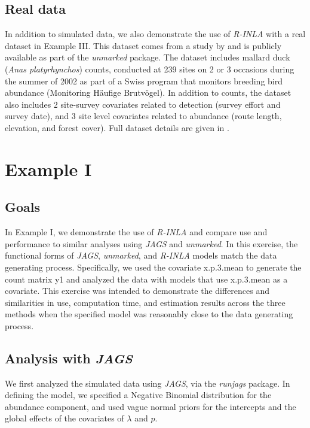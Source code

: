 \documentclass{article}
\begin{document}
\subsection[Real data]{Real data}
In addition to simulated data, we also demonstrate the use of \emph{R-INLA} with a real dataset in Example III. This dataset comes from a study by \cite{Kery_Royle_Schmid_2005} and is publicly available as part of the \emph{unmarked} package. The dataset includes mallard duck (\emph{Anas platyrhynchos}) counts, conducted at 239 sites on 2 or 3 occasions during the summer of 2002 as part of a Swiss program that monitors breeding bird abundance (Monitoring H\"{a}ufige Brutv\"{o}gel). In addition to counts, the dataset also includes 2 site-survey covariates related to detection (survey effort and survey date), and 3 site level covariates related to abundance (route length, elevation, and forest cover). Full dataset details are given in \cite{Kery_Royle_Schmid_2005}.

\section[Example I]{Example I}
\subsection[Goals]{Goals}
In Example I, we demonstrate the use of \emph{R-INLA} and compare use and performance to similar analyses using \emph{JAGS} and \emph{unmarked}. In this exercise, the functional forms of \emph{JAGS}, \emph{unmarked}, and \emph{R-INLA} models match the data generating process.  Specifically, we used the covariate x.p.3.mean to generate the count matrix y1 and analyzed the data with models that use x.p.3.mean as a covariate. This exercise was intended to demonstrate the differences and similarities in use, computation time, and estimation results across the three methods when the specified model was reasonably close to the data generating process.

\subsection[Analysis with JAGS]{Analysis with \emph{JAGS}}
We first analyzed the simulated data using \emph{JAGS}, via the \emph{runjags} package. In defining the model, we specified a Negative Binomial distribution for the abundance component, and used vague normal priors for the intercepts and the global effects of the covariates of $\lambda$ and $p$.
\end{document}
